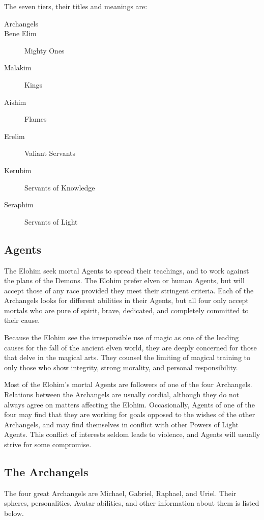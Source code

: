 The seven tiers, their titles and meanings are:

\begin{description}
\item[Archangels]
\item[Bene Elim] Mighty Ones
\item[Malakim] Kings
\item[Aishim] Flames
\item[Erelim] Valiant Servants
\item[Kerubim] Servants of Knowledge
\item[Seraphim] Servants of Light
\end{description}

\subsection{Agents}

The Elohim seek mortal Agents to spread their teachings, and to work
against the plans of the Demons. The Elohim prefer elven or human
Agents, but will accept those of any race provided they meet their
stringent criteria. Each of the Archangels looks for different
abilities in their Agents, but all four only accept mortals who are
pure of spirit, brave, dedicated, and completely committed to their
cause.

Because the Elohim see the irresponsible use of magic as one of the
leading causes for the fall of the ancient elven world, they are
deeply concerned for those that delve in the magical arts. They
counsel the limiting of magical training to only those who show
integrity, strong morality, and personal responsibility.

Most of the Elohim's mortal Agents are followers of one of the four
Archangels. Relations between the Archangels are usually cordial,
although they do not always agree on matters affecting the
Elohim. Occasionally, Agents of one of the four may find that they are
working for goals opposed to the wishes of the other Archangels, and
may find themselves in conflict with other Powers of Light Agents.
This conflict of interests seldom leads to violence, and Agents will
usually strive for some compromise.

\subsection{The Archangels}

The four great Archangels are Michael, Gabriel, Raphael, and
Uriel. Their spheres, personalities, Avatar abilities, and other
information about them is listed below.


